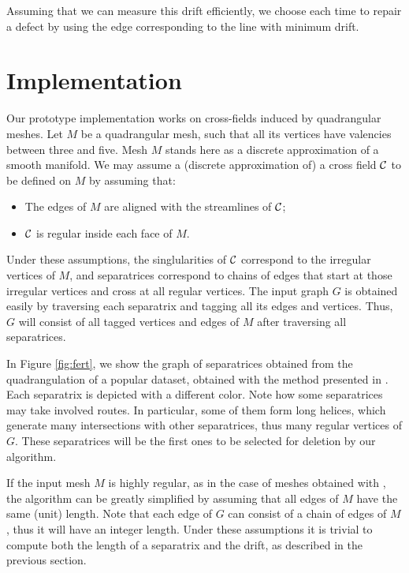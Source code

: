 \documentclass[11pt,a4paper]{article}
\begin{document}
Assuming that we can measure this drift efficiently, we choose each time to repair a defect by using the edge corresponding to the line with minimum drift. 

\section{Implementation}
\label{sec:implementation}

Our prototype implementation works on cross-fields induced by quadrangular meshes.
Let $M$ be a quadrangular mesh, such that all its vertices have valencies between three and five.
Mesh $M$ stands here as a discrete approximation of a smooth manifold.
We may assume a (discrete approximation of) a cross field $\cal C$ to be defined on $M$ by assuming that:
\begin{itemize}
\item The edges of $M$ are aligned with the streamlines of $\cal C$;
\item $\cal C$ is regular inside each face of $M$.
\end{itemize}
Under these assumptions, the singlularities of $\cal C$ correspond to the irregular vertices of $M$, and separatrices correspond to chains of edges that start at those irregular vertices and cross at all regular vertices.
The input graph $G$ is obtained easily by traversing each separatrix and tagging all its edges and vertices.
Thus, $G$ will consist of all tagged vertices and edges of $M$ after traversing all separatrices.

In Figure \ref{fig:fert}, we show the graph of separatrices obtained from the quadrangulation of a popular dataset, obtained with the method presented in \cite{BomZimKob09}.
Each separatrix is depicted with a different color.
Note how some separatrices may take involved routes. 
In particular, some of them form long helices, which generate many intersections with other separatrices, thus many regular vertices of $G$.
These separatrices will be the first ones to be selected for deletion by our algorithm.

If the input mesh $M$ is highly regular, as in the case of meshes obtained with \cite{BomZimKob09}, the algorithm can be greatly simplified by assuming that all edges of $M$ have the same (unit) length.
Note that each edge of $G$ can consist of a chain of edges of $M$, thus it will have an integer length.
Under these assumptions it is trivial to compute both the length of a separatrix and the drift, as described in the previous section. 
\end{document}
